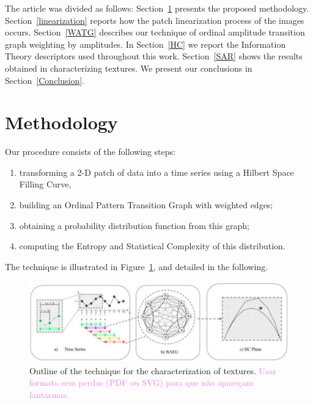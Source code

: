 \documentclass{isprs}
\begin{document}




The article was divided as follows:
Section~\ref{methodology} presents the proposed methodology.
Section~\ref{linearization} reports how the patch linearization process of the images occurs.
Section~\ref{WATG} describes our technique of ordinal amplitude transition graph weighting by amplitudes.
In Section~\ref{HC} we report the Information Theory descriptors used throughout this work.
Section~\ref{SAR} shows the results obtained in characterizing textures.
We present our conclusions in Section~\ref{Conclusion}.


\section{Methodology}\label{methodology}

Our procedure consists of the following steps:
\begin{enumerate}
	\item\label{item:Linearlize} transforming a 2-D patch of data into a time series using a Hilbert Space Filling Curve,
	\item\label{item:WOPTG} building an Ordinal Pattern Transition Graph with weighted edges;
	\item\label{item:Probability} obtaining a probability distribution function from this graph;
	\item\label{item:Descriptors} computing the Entropy and Statistical Complexity of this distribution.
\end{enumerate}
The technique is illustrated in Figure~\ref{fig:WATG}, and detailed in the following.

\begin{figure}[hbt]
	\centering
	\includegraphics[scale = 0.5]{Figures/WATG.pdf}
	\caption{Outline of the technique for the characterization of textures. \textcolor{violet}{Usar formato sem perdas (PDF ou SVG) para que não apare\c cam fantasmas.}}
	\label{fig:WATG}
\end{figure}
\end{document}
